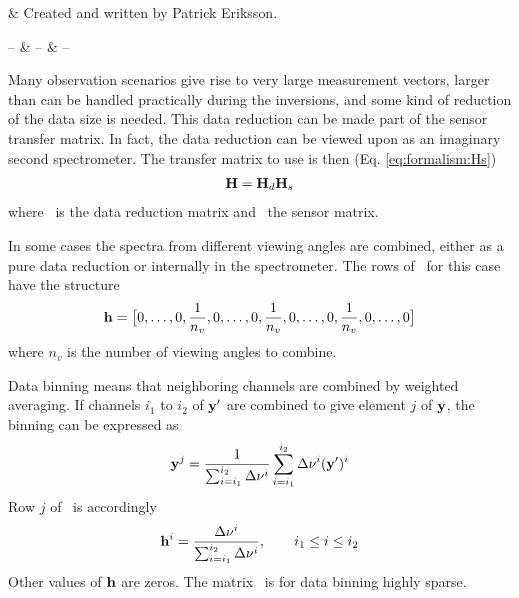 %
%
 \label{sec:red}


%
%
 & Created and written by Patrick Eriksson.\\
\stophistory


%
%
%
\startsymbols
  -- & -- & -- \\
 \label{symtable:red}     
\stopsymbols



%
%
Many observation scenarios give rise to very large measurement
vectors, larger than can be handled practically during the inversions,
and some kind of reduction of the data size is needed. This data
reduction can be made part of the sensor transfer matrix. In fact, the
data reduction can be viewed upon as an imaginary second spectrometer.
The transfer matrix to use is then (Eq. \ref{eq:formalism:Hs})
\begin{eqnarray}
  \mathbf{H} = \mathbf{H}_d \mathbf{H}_s  \nonumber
\end{eqnarray}
where \Hd\ is the data reduction matrix and \Hs\ the sensor matrix.



 \label{sec:red:view}
 
 In some cases the spectra from different viewing angles are combined,
 either as a pure data reduction or internally in the spectrometer.
 The rows of \Hd\ for this case have the structure
 \begin{equation}
   \mathbf{h} = \big[ 0,\dots,0,\frac{1}{n_v},0,\dots,0,\frac{1}{n_v},0,\dots,0,\frac{1}{n_v},0,\dots,0\big]
 \end{equation}
 where $n_v$ is the number of viewing angles to combine.


 \label{sec:red:binning}
 
 Data binning means that neighboring channels are combined by
 weighted averaging. If channels $i_1$ to $i_2$ of $\mathbf{y}'$ are combined to
 give element $j$ of $\mathbf{y}$, the binning can be expressed as
 \begin{equation}
   \mathbf{y}^j = \frac{1}{\sum_{i=i_1}^{i_2}{\Delta \nu^i}} \sum_{i=i_1}^{i_2}{\Delta \nu^i (\mathbf{y}')^i}
 \end{equation}
 Row $j$ of \Hd\ is accordingly
 \begin{equation}
   \mathbf{h}^i = \frac{\Delta \nu^i}{\sum_{i=i_1}^{i_2}{\Delta \nu^i}}, \qquad
    i_1\leq i \leq i_2
 \end{equation}
 Other values of $\mathbf{h}$ are zeros. The matrix \Hd\ is for data
 binning highly sparse.



